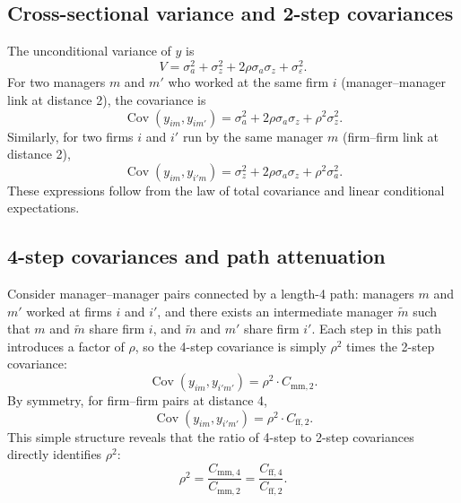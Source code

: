 \documentclass[9pt,twocolumn,twoside]{pnas-new}
\begin{document}
\subsection*{Cross-sectional variance and 2-step covariances}
The unconditional variance of $y$ is
\begin{equation}
\label{eq:var}
 V = \sigma_a^2 + \sigma_z^2 + 2\rho\sigma_a\sigma_z + \sigma_\varepsilon^2.
\end{equation}
For two managers $m$ and $m'$ who worked at the same firm $i$ (manager--manager link at distance 2), the covariance is
\begin{equation}
\label{eq:mm2}
 \operatorname{Cov}(y_{im}, y_{im'}) = \sigma_a^2 + 2\rho\sigma_a\sigma_z + \rho^2\sigma_z^2.
\end{equation}
Similarly, for two firms $i$ and $i'$ run by the same manager $m$ (firm--firm link at distance 2),
\begin{equation}
\label{eq:ff2}
 \operatorname{Cov}(y_{im}, y_{i'm}) = \sigma_z^2 + 2\rho\sigma_a\sigma_z + \rho^2\sigma_a^2.
\end{equation}
These expressions follow from the law of total covariance and linear conditional expectations.

\subsection*{4-step covariances and path attenuation}
Consider manager--manager pairs connected by a length-4 path: managers $m$ and $m'$ worked at firms $i$ and $i'$, and there exists an intermediate manager $\tilde m$ such that $m$ and $\tilde m$ share firm $i$, and $\tilde m$ and $m'$ share firm $i'$. Each step in this path introduces a factor of $\rho$, so the 4-step covariance is simply $\rho^2$ times the 2-step covariance:
\begin{equation}
\label{eq:mm4}
 \operatorname{Cov}(y_{im}, y_{i'm'}) = \rho^2 \cdot C_{\text{mm},2}.
\end{equation}
By symmetry, for firm--firm pairs at distance 4,
\begin{equation}
\label{eq:ff4}
 \operatorname{Cov}(y_{im}, y_{i'm'}) = \rho^2 \cdot C_{\text{ff},2}.
\end{equation}
This simple structure reveals that the ratio of 4-step to 2-step covariances directly identifies $\rho^2$:
\begin{equation}
\label{eq:rho-ratio}
 \rho^2 = \frac{C_{\text{mm},4}}{C_{\text{mm},2}} = \frac{C_{\text{ff},4}}{C_{\text{ff},2}}.
\end{equation}
\end{document}
